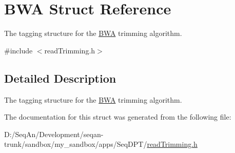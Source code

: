 \hypertarget{struct_b_w_a}{\section{B\-W\-A Struct Reference}
\label{struct_b_w_a}
}


The tagging structure for the \hyperlink{struct_b_w_a}{B\-W\-A} trimming algorithm.  




{\ttfamily \#include $<$read\-Trimming.\-h$>$}



\subsection{Detailed Description}
The tagging structure for the \hyperlink{struct_b_w_a}{B\-W\-A} trimming algorithm. 

The documentation for this struct was generated from the following file\-:\begin{DoxyCompactItemize}
\item 
D\-:/\-Seq\-An/\-Development/seqan-\/trunk/sandbox/my\-\_\-sandbox/apps/\-Seq\-D\-P\-T/\hyperlink{read_trimming_8h}{read\-Trimming.\-h}\end{DoxyCompactItemize}
